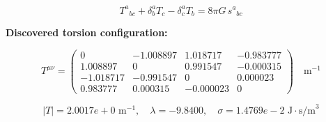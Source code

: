
\begin{equation}
  T^a{}_{bc} + \delta^a_b T_c - \delta^a_c T_b = 8\pi G \, s^a{}_{bc}
\end{equation}

\textbf{Discovered torsion configuration:}

\begin{equation}
  T^{\mu\nu} = \begin{pmatrix}
    0 & -1.008897 & 1.018717 & -0.983777 \\
    1.008897 & 0 & 0.991547 & -0.000315 \\
    -1.018717 & -0.991547 & 0 & 0.000023 \\
    0.983777 & 0.000315 & -0.000023 & 0
  \end{pmatrix} \quad \text{m}^{-1}
\end{equation}

\begin{equation}
  |T| = 2.0017e+0 \text{ m}^{-1}, \quad
  \lambda = -9.8400, \quad
  \sigma = 1.4769e-2 \text{ J}\cdot\text{s/m}^3
\end{equation}